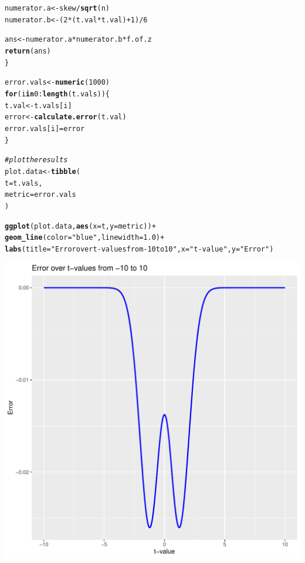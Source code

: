 \documentclass{article}\usepackage[]{graphicx}\usepackage[]{xcolor}
\makeatletter
\def\maxwidth{ %
  \ifdim\Gin@nat@width>\linewidth
    \linewidth
  \else
    \Gin@nat@width
  \fi
}
\newcommand{\hlnum}[1]{\textcolor[rgb]{0.686,0.059,0.569}{#1}}%
\newcommand{\hlsng}[1]{\textcolor[rgb]{0.192,0.494,0.8}{#1}}%
\newcommand{\hlcom}[1]{\textcolor[rgb]{0.678,0.584,0.686}{\textit{#1}}}%
\newcommand{\hlopt}[1]{\textcolor[rgb]{0,0,0}{#1}}%
\newcommand{\hldef}[1]{\textcolor[rgb]{0.345,0.345,0.345}{#1}}%
\newcommand{\hlkwa}[1]{\textcolor[rgb]{0.161,0.373,0.58}{\textbf{#1}}}%
\newcommand{\hlkwb}[1]{\textcolor[rgb]{0.69,0.353,0.396}{#1}}%
\newcommand{\hlkwc}[1]{\textcolor[rgb]{0.333,0.667,0.333}{#1}}%
\newcommand{\hlkwd}[1]{\textcolor[rgb]{0.737,0.353,0.396}{\textbf{#1}}}%
\newenvironment{kframe}{%
 \def\at@end@of@kframe{}%
 \ifinner\ifhmode%
  \def\at@end@of@kframe{\end{minipage}}%
  \begin{minipage}{\columnwidth}%
 \fi\fi%
 \def\FrameCommand##1{\hskip\@totalleftmargin \hskip-\fboxsep
 \colorbox{shadecolor}{##1}\hskip-\fboxsep
     \hskip-\linewidth \hskip-\@totalleftmargin \hskip\columnwidth}%
 \MakeFramed {\advance\hsize-\width
   \@totalleftmargin\z@ \linewidth\hsize
   \@setminipage}}%
 {\par\unskip\endMakeFramed%
 \at@end@of@kframe}
\newenvironment{knitrout}{}{} %
\makeatother
\begin{document}
\begin{enumerate}
\begin{enumerate}
\begin{knitrout}
\begin{kframe}
\begin{alltt}
\hldef{numerator.a} \hlkwb{<-} \hldef{skew} \hlopt{/} \hlkwd{sqrt}\hldef{(n)}
\hldef{numerator.b} \hlkwb{<-} \hldef{(}\hlnum{2}\hlopt{*}\hldef{(t.val}\hlopt{*}\hldef{t.val)} \hlopt{+} \hlnum{1}\hldef{)}\hlopt{/}\hlnum{6}

\hldef{ans} \hlkwb{<-} \hldef{numerator.a}\hlopt{*}\hldef{numerator.b}\hlopt{*}\hldef{f.of.z}
\hlkwd{return}\hldef{(ans)}
\hldef{\}}

\hldef{error.vals} \hlkwb{<-} \hlkwd{numeric}\hldef{(}\hlnum{1000}\hldef{)}
\hlkwa{for} \hldef{(i} \hlkwa{in} \hlnum{0}\hlopt{:}\hlkwd{length}\hldef{(t.vals))\{}
\hldef{t.val} \hlkwb{<-} \hldef{t.vals[i]}
\hldef{error} \hlkwb{<-} \hlkwd{calculate.error}\hldef{(t.val)}
\hldef{error.vals[i]} \hlkwb{=} \hldef{error}
\hldef{\}}

\hlcom{#plot the results}
\hldef{plot.data} \hlkwb{<-} \hlkwd{tibble}\hldef{(}
\hlkwc{t} \hldef{= t.vals,}
\hlkwc{metric} \hldef{= error.vals}
\hldef{)}

\hlkwd{ggplot}\hldef{(plot.data,} \hlkwd{aes}\hldef{(}\hlkwc{x} \hldef{= t,} \hlkwc{y} \hldef{= metric))} \hlopt{+}
\hlkwd{geom_line}\hldef{(}\hlkwc{color} \hldef{=} \hlsng{"blue"}\hldef{,} \hlkwc{linewidth} \hldef{=} \hlnum{1.0}\hldef{)} \hlopt{+}
\hlkwd{labs}\hldef{(}\hlkwc{title} \hldef{=} \hlsng{"Error over t-values from -10 to 10"}\hldef{,} \hlkwc{x} \hldef{=} \hlsng{"t-value"}\hldef{,} \hlkwc{y} \hldef{=} \hlsng{"Error"}\hldef{)}
\end{alltt}
\end{kframe}
\includegraphics[width=\maxwidth]{figure/unnamed-chunk-3-1} 
\end{knitrout}


\end{enumerate}
\end{enumerate}
\end{document}
